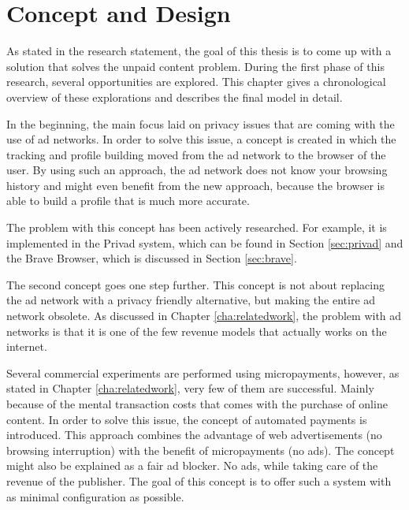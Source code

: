 \chapter{Concept and Design}
\label{cha:conceptanddesign}

As stated in the research statement, the goal of this thesis is to come up with a solution that solves the unpaid content problem. During the first phase of this research, several opportunities are explored. This chapter gives a chronological overview of these explorations and describes the final model in detail.

In the beginning, the main focus laid on privacy issues that are coming with the use of ad networks. In order to solve this issue, a concept is created in which the tracking and profile building moved from the ad network to the browser of the user. By using such an approach, the ad network does not know your browsing history and might even benefit from the new approach, because the browser is able to build a profile that is much more accurate. 

The problem with this concept has been actively researched. For example, it is implemented in the Privad system, which can be found in Section \ref{sec:privad} and the Brave Browser, which is discussed in Section \ref{sec:brave}.

\label{sec:uaps}
The second concept goes one step further. This concept is not about replacing the ad network with a privacy friendly alternative, but making the entire ad network obsolete. As discussed in Chapter \ref{cha:relatedwork}, the problem with ad networks is that it is one of the few revenue models that actually works on the internet.

Several commercial experiments are performed using micropayments, however, as stated in Chapter \ref{cha:relatedwork}, very few of them are successful. Mainly because of the mental transaction costs that comes with the purchase of online content. In order to solve this issue, the concept of automated payments is introduced. This approach combines the advantage of web advertisements (no browsing interruption) with the benefit of micropayments (no ads). The concept might also be explained as a fair ad blocker. No ads, while taking care of the revenue of the publisher. The goal of this concept is to offer such a system with as minimal configuration as possible.

\newpage

